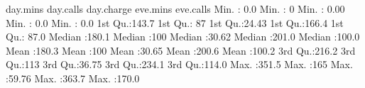 \documentclass[
  11pt,
]{book}
\makeatletter
\newenvironment{Shaded}{}{}
\newcommand{\DecValTok}[1]{#1}
\newcommand{\FloatTok}[1]{#1}
\newcommand{\NormalTok}[1]{#1}
\newcommand{\SpecialCharTok}[1]{\textcolor[rgb]{0.39,0.39,0.39}{#1}}
\newenvironment{kframe}{%
\medskip{}
\setlength{\fboxsep}{.8em}
 \def\at@end@of@kframe{}%
 \ifinner\ifhmode%
  \def\at@end@of@kframe{\end{minipage}}%
  \begin{minipage}{\columnwidth}%
 \fi\fi%
 \def\FrameCommand##1{\hskip\@totalleftmargin \hskip-\fboxsep
 \colorbox{shadecolor}{##1}\hskip-\fboxsep
     \hskip-\linewidth \hskip-\@totalleftmargin \hskip\columnwidth}%
 \MakeFramed {\advance\hsize-\width
   \@totalleftmargin\z@ \linewidth\hsize
   \@setminipage}}%
 {\par\unskip\endMakeFramed%
 \at@end@of@kframe}
\renewenvironment{Shaded}{\begin{kframe}}{\end{kframe}}
\theoremstyle{definition}
\theoremstyle{definition}
\theoremstyle{definition}
\theoremstyle{definition}
\theoremstyle{remark}
\makeatother
\begin{document}
\begin{Shaded}
\begin{Highlighting}[]
\NormalTok{       day.mins       day.calls     day.charge       eve.mins       eve.calls    }
\NormalTok{    Min.   }\SpecialCharTok{:}  \FloatTok{0.0}\NormalTok{   Min.   }\SpecialCharTok{:}  \DecValTok{0}\NormalTok{   Min.   }\SpecialCharTok{:} \FloatTok{0.00}\NormalTok{   Min.   }\SpecialCharTok{:}  \FloatTok{0.0}\NormalTok{   Min.   }\SpecialCharTok{:}  \FloatTok{0.0}  
    \DecValTok{1}\NormalTok{st Qu.}\SpecialCharTok{:}\FloatTok{143.7}   \DecValTok{1}\NormalTok{st Qu.}\SpecialCharTok{:} \DecValTok{87}   \DecValTok{1}\NormalTok{st Qu.}\SpecialCharTok{:}\FloatTok{24.43}   \DecValTok{1}\NormalTok{st Qu.}\SpecialCharTok{:}\FloatTok{166.4}   \DecValTok{1}\NormalTok{st Qu.}\SpecialCharTok{:} \FloatTok{87.0}  
\NormalTok{    Median }\SpecialCharTok{:}\FloatTok{180.1}\NormalTok{   Median }\SpecialCharTok{:}\DecValTok{100}\NormalTok{   Median }\SpecialCharTok{:}\FloatTok{30.62}\NormalTok{   Median }\SpecialCharTok{:}\FloatTok{201.0}\NormalTok{   Median }\SpecialCharTok{:}\FloatTok{100.0}  
\NormalTok{    Mean   }\SpecialCharTok{:}\FloatTok{180.3}\NormalTok{   Mean   }\SpecialCharTok{:}\DecValTok{100}\NormalTok{   Mean   }\SpecialCharTok{:}\FloatTok{30.65}\NormalTok{   Mean   }\SpecialCharTok{:}\FloatTok{200.6}\NormalTok{   Mean   }\SpecialCharTok{:}\FloatTok{100.2}  
    \DecValTok{3}\NormalTok{rd Qu.}\SpecialCharTok{:}\FloatTok{216.2}   \DecValTok{3}\NormalTok{rd Qu.}\SpecialCharTok{:}\DecValTok{113}   \DecValTok{3}\NormalTok{rd Qu.}\SpecialCharTok{:}\FloatTok{36.75}   \DecValTok{3}\NormalTok{rd Qu.}\SpecialCharTok{:}\FloatTok{234.1}   \DecValTok{3}\NormalTok{rd Qu.}\SpecialCharTok{:}\FloatTok{114.0}  
\NormalTok{    Max.   }\SpecialCharTok{:}\FloatTok{351.5}\NormalTok{   Max.   }\SpecialCharTok{:}\DecValTok{165}\NormalTok{   Max.   }\SpecialCharTok{:}\FloatTok{59.76}\NormalTok{   Max.   }\SpecialCharTok{:}\FloatTok{363.7}\NormalTok{   Max.   }\SpecialCharTok{:}\FloatTok{170.0}  
                                                                                 

\end{Highlighting}
\end{Shaded}
\end{document}
